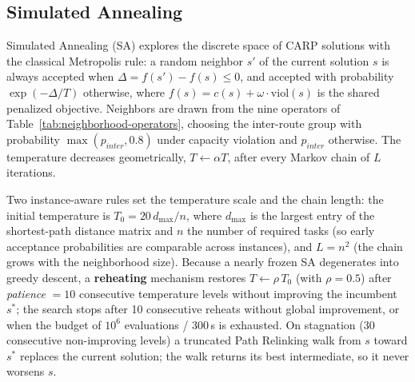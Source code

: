 \subsection{Simulated Annealing}
\label{subsec:sa}

Simulated Annealing (SA) explores the discrete space of CARP solutions with
the classical Metropolis rule: a random neighbor $s'$ of the current solution
$s$ is always accepted when $\Delta = f(s') - f(s) \leq 0$, and accepted with
probability $\exp(-\Delta/T)$ otherwise, where $f(s) = c(s) + \omega \cdot
\mathrm{viol}(s)$ is the shared penalized objective. Neighbors are drawn from
the nine operators of Table~\ref{tab:neighborhood-operators}, choosing the
inter-route group with probability $\max(p_{inter}, 0.8)$ under capacity
violation and $p_{inter}$ otherwise. The temperature decreases geometrically,
$T \leftarrow \alpha T$, after every Markov chain of $L$ iterations.

Two instance-aware rules set the temperature scale and the chain length: the
initial temperature is $T_0 = 20\, d_{\max} / n$, where $d_{\max}$ is the
largest entry of the shortest-path distance matrix and $n$ the number of
required tasks (so early acceptance probabilities are comparable across
instances), and $L = n^2$ (the chain grows with the neighborhood size).
Because a nearly frozen SA degenerates into greedy descent, a
\textbf{reheating} mechanism restores $T \leftarrow \rho\, T_0$ (with
$\rho = 0.5$) after \textit{patience} $= 10$ consecutive temperature levels
without improving the incumbent $s^{*}$; the search stops after 10
consecutive reheats without global improvement, or when the budget of
$10^6$ evaluations / 300\,s is exhausted. On stagnation (30 consecutive
non-improving levels) a truncated Path Relinking walk from $s$ toward
$s^{*}$ replaces the current solution; the walk returns its best
intermediate, so it never worsens $s$.

